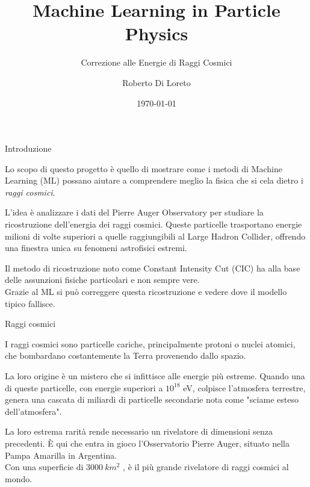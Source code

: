 \documentclass[10pt]{beamer}
\title{Machine Learning in Particle Physics}
\subtitle{Correzione alle Energie di Raggi Cosmici}
\author[R. Di Loreto]{Roberto Di Loreto}
\institute[UNIVAQ]{Università degli Studi dell'Aquila}
\date{\today}
\begin{document}
\begin{frame}
	\titlepage
\end{frame}

\begin{frame}{Introduzione}

Lo scopo di questo progetto è quello di mostrare come i metodi di Machine Learning (ML) possano aiutare a comprendere meglio la fisica che si cela dietro i \emph{raggi cosmici}.
\bigskip

L'idea è analizzare i dati del Pierre Auger Observatory per studiare la ricostruzione dell'energia dei raggi cosmici. Queste particelle trasportano energie milioni di volte superiori a quelle raggiungibili al Large Hadron Collider, offrendo una finestra unica su fenomeni astrofisici estremi. \bigskip

Il metodo di ricostruzione noto come Constant Intensity Cut (CIC) ha alla base delle assunzioni fisiche particolari e non sempre vere.\\ Grazie al ML si può correggere questa ricostruzione e vedere dove il modello tipico fallisce. 

\end{frame}

\begin{frame}{Raggi cosmici}

I raggi cosmici sono particelle cariche, principalmente protoni o nuclei atomici, che bombardano costantemente la Terra provenendo dallo spazio.\bigskip

La loro origine è un mistero che si infittisce alle energie più estreme. Quando una di queste particelle, con energie superiori a $10^{18}$ eV, colpisce l'atmosfera terrestre, genera una cascata di miliardi di particelle secondarie nota come "sciame esteso dell'atmosfera".\bigskip

La loro estrema rarità rende necessario un rivelatore di dimensioni senza precedenti. È qui che entra in gioco l'Osservatorio Pierre Auger, situato nella Pampa Amarilla in Argentina.\\
Con una superficie di $3000\ km^2$ , è il più grande rivelatore di raggi cosmici al mondo.

\end{frame}
\end{document}
